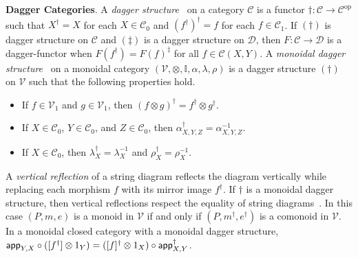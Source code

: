 \vspace{1em}
\noindent
\textbf{Dagger Categories}.
%
A \emph{dagger structure}~\cite{Selinger2007} on a category $\mathcal{C}$ is a functor $\dagger: \mathcal{C} \to \mathcal{C}^{\text{op}}$ such that $X^\dagger = X$ for each $X \in \mathcal{C}_0$ and $( f^\dagger )^\dagger = f$ for each $f \in \mathcal{C}_1$.
If $( \dagger )$ is dagger structure on $\mathcal{C}$ and $( \ddagger )$ is a dagger structure on $\mathcal{D}$, then $F: \mathcal{C} \to \mathcal{D}$ is a dagger-functor when $F( f^\dagger ) = F( f )^\ddagger$ for all $f \in \mathcal{C}( X, Y )$.
A \emph{monoidal dagger structure}~\cite{Selinger2007,Selinger_2010} on a monoidal category $( \mathcal{V}, \otimes, \mathbb{I}, \alpha, \lambda, \rho )$ is a dagger structure $( \dagger )$ on $\mathcal{V}$ such that the following properties hold.
\begin{itemize}
\item If $f \in \mathcal{V}_1$ and $g \in \mathcal{V}_1$, then $( f \otimes g )^\dagger = f^\dagger \otimes g^\dagger$.
\item If $X \in \mathcal{C}_0$, $Y \in \mathcal{C}_0$, and $Z \in \mathcal{C}_0$, then $\alpha_{X,Y,Z}^\dagger = \alpha_{X,Y,Z}^{-1}$.
\item If $X \in \mathcal{C}_0$, then $\lambda_X^\dagger = \lambda_X^{-1}$ and $\rho_X^\dagger = \rho_X^{-1}$.
\end{itemize}
A \emph{vertical reflection} of a string diagram reflects the diagram vertically while replacing each morphism $f$ with its mirror image $f^\dagger$.
If $\dagger$ is a monoidal dagger structure, then vertical reflections respect the equality of string diagrams~\cite{Selinger_2010}.
In this case $( P, m ,e )$ is a monoid in $\mathcal{V}$ if and only if $( P, m^\dagger, e^\dagger )$ is a comonoid in $\mathcal{V}$.
In a monoidal closed category with a monoidal dagger structure, $\mathsf{app}_{Y,X} \circ ( [f^\dagger] \otimes 1_Y ) = ( [f]^\dagger \otimes 1_X ) \circ \mathsf{app}_{X,Y}^\dagger$.

